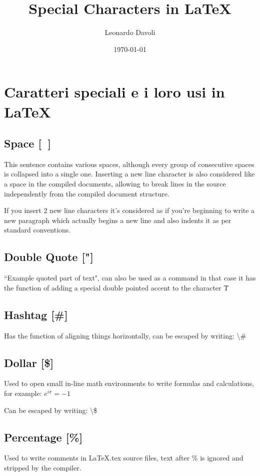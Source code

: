 \documentclass[a4paper]{article}
\author{Leonardo Davoli}
\title{Special Characters in \LaTeX}
\date{\today}
\begin{document}
	\maketitle
	\tableofcontents

	\section{Caratteri speciali e i loro usi in \LaTeX}

	\subsection{Space [\ ]}
	This      sentence      contains various   spaces,
	although every group of consecutive spaces is collapsed into a single one.
	Inserting a new line character is also considered like a space in the compiled documents,
	allowing to break lines in the source independently from the compiled document structure.

	If you insert 2 new line characters it's considered as if you're beginning 
	to write a new paragraph which actually begins a new line and also indents it as per standard conventions.

	\subsection{Double Quote ["]}
	``Example quoted part of text", can also be used as a command in that case it has the
	function of adding a special double pointed accent to the character \"{T}

	\subsection{Hashtag [\#]}
	Has the function of aligning things horizontally, can be escaped by writing: \textbackslash\#

	\subsection{Dollar [\${}]}
	Used to open small in-line math environments to write formulas and calculations,
	for example: $ e^{i\pi} = -1 $

	Can be escaped by writing: \textbackslash\$

	\subsection{Percentage [\%]}
	Used to write comments in \LaTeX .tex source files,
	text after \% is ignored and stripped by the compiler.
\end{document}
